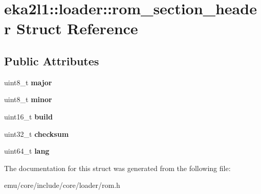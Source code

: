\hypertarget{structeka2l1_1_1loader_1_1rom__section__header}{}\section{eka2l1\+:\+:loader\+:\+:rom\+\_\+section\+\_\+header Struct Reference}
\label{structeka2l1_1_1loader_1_1rom__section__header}
\subsection*{Public Attributes}
\begin{DoxyCompactItemize}
\item 
\mbox{\label{structeka2l1_1_1loader_1_1rom__section__header_a1f2744ef715983a12ec39eaaf24909de}} 
uint8\+\_\+t {\bfseries major}
\item 
\mbox{\label{structeka2l1_1_1loader_1_1rom__section__header_ad67cf3fab1ca2a744fb333a010e0c80b}} 
uint8\+\_\+t {\bfseries minor}
\item 
\mbox{\label{structeka2l1_1_1loader_1_1rom__section__header_a749e398ef53f9962cacb076d79680717}} 
uint16\+\_\+t {\bfseries build}
\item 
\mbox{\label{structeka2l1_1_1loader_1_1rom__section__header_a2444f7ee60a882b04e22d7d75e23cc94}} 
uint32\+\_\+t {\bfseries checksum}
\item 
\mbox{\label{structeka2l1_1_1loader_1_1rom__section__header_a2b6bb927e2147e3069f580fd2fe191ed}} 
uint64\+\_\+t {\bfseries lang}
\end{DoxyCompactItemize}


The documentation for this struct was generated from the following file\+:\begin{DoxyCompactItemize}
\item 
emu/core/include/core/loader/rom.\+h\end{DoxyCompactItemize}
